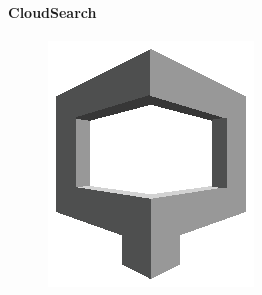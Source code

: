\documentclass[
12pt,
english,
ngerman,
headsepline,
twoside,
openright,
numbers=noenddot,version=first
]{scrreprt}
\begin{document}
\paragraph{CloudSearch}
\begin{figure}
	\includegraphics[width=0.9\linewidth]{./pics/aws/Analytics_GRAYSCALE_AmazonCloudSearch.eps}
\end{figure}
\end{document}
